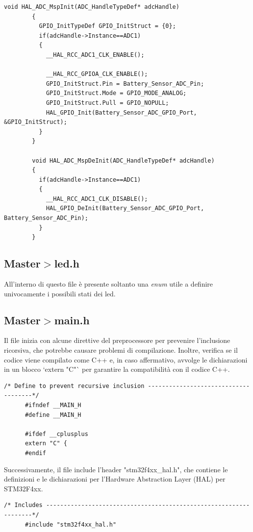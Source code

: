 \documentclass{article}
\begin{document}
        \begin{lstlisting}[style=CStyle]
        void HAL_ADC_MspInit(ADC_HandleTypeDef* adcHandle)
        {
          GPIO_InitTypeDef GPIO_InitStruct = {0};
          if(adcHandle->Instance==ADC1)
          {
            __HAL_RCC_ADC1_CLK_ENABLE();
        
            __HAL_RCC_GPIOA_CLK_ENABLE();
            GPIO_InitStruct.Pin = Battery_Sensor_ADC_Pin;
            GPIO_InitStruct.Mode = GPIO_MODE_ANALOG;
            GPIO_InitStruct.Pull = GPIO_NOPULL;
            HAL_GPIO_Init(Battery_Sensor_ADC_GPIO_Port, &GPIO_InitStruct);
          }
        }
        
        void HAL_ADC_MspDeInit(ADC_HandleTypeDef* adcHandle)
        {
          if(adcHandle->Instance==ADC1)
          {
            __HAL_RCC_ADC1_CLK_DISABLE();
            HAL_GPIO_DeInit(Battery_Sensor_ADC_GPIO_Port, Battery_Sensor_ADC_Pin);
          }
        }
        \end{lstlisting}
    \subsection{Master$>$led.h}
        All'interno di questo file è presente soltanto una \textit{enum} utile a definire univocamente i possibili stati dei led. 
    \subsection{Master$>$main.h}
        
      Il file inizia con alcune direttive del preprocessore per prevenire l'inclusione ricorsiva, che potrebbe causare problemi di compilazione. Inoltre, verifica se il codice viene compilato come C++ e, in caso affermativo, avvolge le dichiarazioni in un blocco `extern "C"` per garantire la compatibilità con il codice C++.

      \begin{lstlisting}[style=CStyle]
      /* Define to prevent recursive inclusion -------------------------------------*/
      #ifndef __MAIN_H
      #define __MAIN_H

      #ifdef __cplusplus
      extern "C" {
      #endif
      \end{lstlisting}

      Successivamente, il file include l'header "stm32f4xx\_hal.h", che contiene le definizioni e le dichiarazioni per l'Hardware Abstraction Layer (HAL) per STM32F4xx.

      \begin{lstlisting}[style=CStyle]
      /* Includes ------------------------------------------------------------------*/
      #include "stm32f4xx_hal.h"
      \end{lstlisting}
\end{document}
